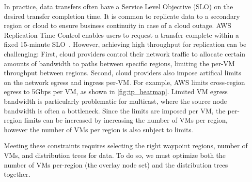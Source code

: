 In practice, data transfers often have a Service Level Objective (SLO) on the desired transfer completion time.
% 
It is common to replicate data to a secondary region or cloud to ensure business continuity in case of a cloud outage.
% 
AWS Replication Time Control enables users to request a transfer complete within a fixed 15-minute SLO~\cite{aws-replication-time-control}.
%
However, achieving high throughput for replication can be challenging: First, cloud providers control their network traffic to allocate certain amounts of bandwidth to paths between specific regions, limiting the per-VM throughput between regions.  Second, cloud providers also impose artifical limits on the network egress and ingress per-VM. For example, AWS limits cross-region egress to 5Gbps per VM, as shown in \cref{fig:tp_heatmap}. Limited VM egress bandwidth is particularly problematic for multicast, where the source node bandwidth is often a bottleneck. Since the limits are imposed per VM, the per-region limits can be increased by increasing the number of VMs per region, however the number of VMs per region is also subject to limits. 

Meeting these constraints requires selecting the right waypoint regions, number of VMs, and distribution trees for data. To do so, we must optimize both the number of VMs per-region (the overlay node set) and the distribution trees together.   




